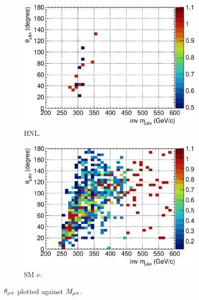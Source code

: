         \begin{figure}[!htb]
           \centering
           \begin{subfigure}{\dbfigwid\textwidth}
                \includegraphics[width=\textwidth]{figures/hnl/hnl_sfgmu_mpinvm_colnor_vs_mpang_hist2d_al9_300.eps}
                \caption{HNL.}
                \label{fig:hnl-mmupi}
           \end{subfigure}
           \begin{subfigure}{\dbfigwid\textwidth}
                \includegraphics[width=\textwidth]{figures/hnl/hnl_sfgmu_mpinvm_colnor_vs_mpang_hist2d_al9_SM.eps}
                \caption{SM $\nu$.}
                \label{fig:sm-mmupi}
           \end{subfigure}
           \caption{$\theta_{\mu\pi}$ plotted against $M_{\mu\pi}$.}
           \label{fig:mmupi-mupiang}
        \end{figure}

